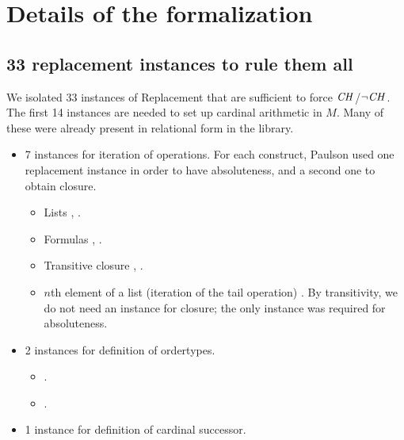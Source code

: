 \section{Details of the formalization}

\subsection{33 replacement instances to rule them all}
\label{sec:33-repl-inst-rule}

We isolated 33 instances of Replacement that are sufficient to force
$\mathit{CH}$/$\neg\mathit{CH}$. The first 14 instances are needed to set up
cardinal arithmetic in $M$. Many of these were already present in
relational form in the  library.

\begin{itemize}
\item 7 instances for iteration of operations. For each construct,
  Paulson used one replacement instance in order to have absoluteness,
  and a second one to obtain closure.
  \begin{itemize}
  \item
    Lists
    ,
    .
  \item
    Formulas
    ,
    .
  \item
    Transitive closure %
    ,
    .
  \item
    $n$th element of a list (iteration of the tail operation)
    . By transitivity,
    we do not need an instance for closure; the only instance was required
    for absoluteness.
  \end{itemize}
\item
  2 instances for definition of ordertypes.
  \begin{itemize}
  \item {}.
  \item {}.
  \end{itemize}
\item 1 instance for definition of cardinal successor.
  \begin{itemize}

\end{itemize}
\end{itemize}

